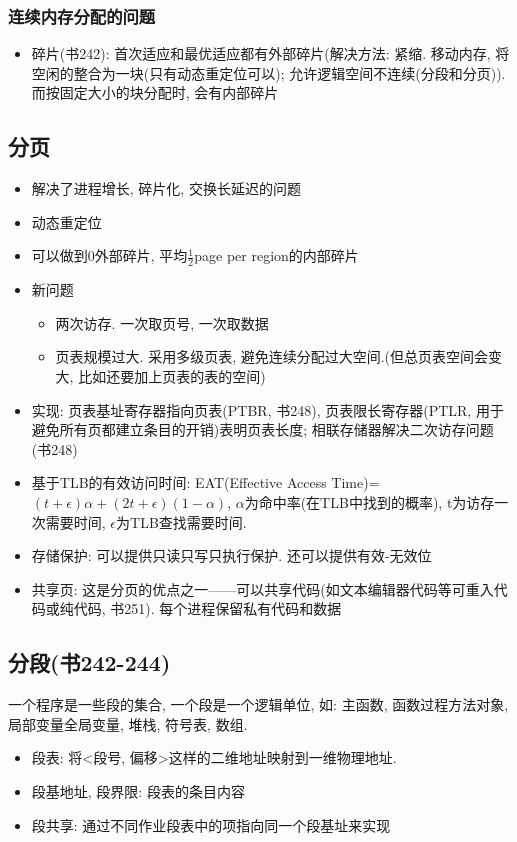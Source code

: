 \documentclass[a4paper, UTF8]{article}
\begin{document}
\subsubsection{连续内存分配的问题}
\begin{itemize}
\item 碎片(书242): 首次适应和最优适应都有外部碎片(解决方法: 紧缩. 移动内存, 将空闲的整合为一块(只有动态重定位可以); 允许逻辑空间不连续(分段和分页)). 而按固定大小的块分配时, 会有内部碎片
\end{itemize}
\subsection{分页}
\begin{itemize}
\item 解决了进程增长, 碎片化, 交换长延迟的问题
\item 动态重定位
\item 可以做到0外部碎片, 平均$\frac{1}{2}$page per region的内部碎片
\item 新问题
	\begin{itemize}
	\item 两次访存. 一次取页号, 一次取数据
	\item 页表规模过大. 采用多级页表, 避免连续分配过大空间.(但总页表空间会变大, 比如还要加上页表的表的空间)
	\end{itemize}
\item 实现: 页表基址寄存器指向页表(PTBR, 书248), 页表限长寄存器(PTLR, 用于避免所有页都建立条目的开销)表明页表长度; 相联存储器解决二次访存问题(书248)
\item 基于TLB的有效访问时间: EAT(Effective Access Time)=$(t+\epsilon)\alpha+(2t+\epsilon)(1-\alpha)$, $\alpha$为命中率(在TLB中找到的概率), t为访存一次需要时间, $\epsilon$为TLB查找需要时间.
\item 存储保护: 可以提供只读只写只执行保护. 还可以提供有效-无效位
\item 共享页: 这是分页的优点之一——可以共享代码(如文本编辑器代码等可重入代码或纯代码, 书251). 每个进程保留私有代码和数据
\end{itemize}
\subsection{分段(书242-244)}
一个程序是一些段的集合, 一个段是一个逻辑单位, 如: 主函数, 函数过程方法对象, 局部变量全局变量, 堆栈, 符号表, 数组.
\begin{itemize}
\item 段表: 将<段号, 偏移>这样的二维地址映射到一维物理地址.
\item 段基地址, 段界限: 段表的条目内容
\item 段共享: 通过不同作业段表中的项指向同一个段基址来实现
\end{itemize}
\end{document}
